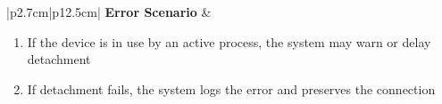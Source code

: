 \begin{table}[H]
\begin{tabular}{|p{2.7cm}|p{12.5cm}|}
            \hline
            \textbf{Error Scenario} & \begin{minipage}[t]{\linewidth}
                                          \begin{enumerate}[topsep=0pt,itemsep=1pt,parsep=0pt,partopsep=0pt]
                                              \item If the device is in use by an active process, the system may warn or delay
                                                    detachment
                                              \item If detachment fails, the system logs the error and preserves the connection
                                          \end{enumerate}
                                      \end{minipage} \\
            \hline
        \end{tabular}
        \label{tab:eng-detach-device}
    \end{table}
